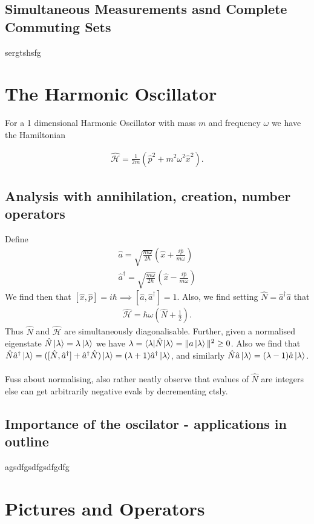 \documentclass{article}
\begin{document}
\subsection{Simultaneous Measurements asnd Complete Commuting Sets}
sergtshsfg
\section{The Harmonic Oscillator}
For a 1 dimensional Harmonic Oscillator with mass $m$ and frequency $\omega$ we have the Hamiltonian

\begin{gather*}
  \hat{\mathcal H}=\frac{1}{2m}(\hat p^2+m^2\omega^2\hat x^2).
\end{gather*}
\subsection{Analysis with annihilation, creation, number operators}

Define
\begin{gather*}
  \hat a=\sqrt{\frac{m\omega}{2\hbar}}(\hat x+\frac{i\hat p}{m\omega})
  \\
  \hat a^\dagger=\sqrt{\frac{m\omega}{2\hbar}}(\hat x-\frac{i\hat p}{m\omega})
\end{gather*}
We find then that $[\hat x,\hat p]=i\hbar \implies [\hat a,\hat a^\dagger]=1$.  Also, we find setting $\hat N=\hat a^\dagger\hat a$ that
\begin{gather*}
  \hat{\mathcal H}=\hbar\omega(\hat N+\frac{1}{2}).
\end{gather*}
Thus $\hat N$ and $\hat{\mathcal H}$ are simultaneously diagonalisable.  Further, given a normalised eigenstate $\hat N\ket\lambda=\lambda\ket \lambda$ we have $\lambda=\braket{\lambda|\hat N|\lambda}=\|a\ket\lambda\|^2\geq 0$.  Also we find that $\hat N\hat a^\dagger\ket\lambda=([\hat N,\hat a^\dagger]+\hat a^\dagger\hat N)\ket\lambda=(\lambda+1)\hat a^\dagger\ket\lambda$, and similarly $\hat N\hat a\ket\lambda=(\lambda-1)\hat a\ket\lambda$.
\\
\\
Fuss about normalising, also rather neatly observe that evalues of $\hat N$ are integers else can get arbitrarily negative evals by decrementing ctsly.
\subsection{Importance of the oscilator - applications in outline}
agsdfgsdfgsdfgdfg
\section{Pictures and Operators}
\end{document}
